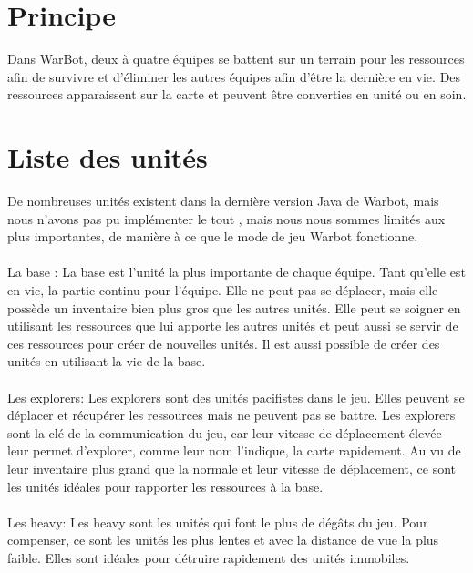 \documentclass{report}
\begin{document}
\section{Principe}
Dans WarBot, deux à quatre équipes se battent sur un terrain pour les ressources afin de survivre et d'éliminer les autres équipes afin d’être la dernière en vie. Des ressources apparaissent sur la carte et peuvent être converties en unité ou en soin.

\section{Liste des unités}
De nombreuses unités existent dans la dernière version Java de Warbot, mais nous n’avons pas pu implémenter le tout , mais nous nous sommes limités aux plus importantes, de manière à ce que le mode de jeu Warbot fonctionne.
\paragraph{}
La base :\newline
La base est l’unité la plus importante de chaque équipe. Tant qu’elle est en vie, la partie continu pour l’équipe. \newline
Elle ne peut pas se déplacer, mais elle possède un inventaire bien plus gros que les autres unités. Elle peut se soigner en utilisant les ressources que lui apporte les autres unités et peut aussi se servir de ces ressources pour créer de nouvelles unités. Il est aussi possible de créer des unités en utilisant la vie de la base.
\paragraph{}
Les explorers:\newline
Les explorers sont des unités pacifistes dans le jeu. Elles peuvent se déplacer et récupérer les ressources mais ne peuvent pas se battre.\newline
Les explorers sont la clé de la communication du jeu, car leur vitesse de déplacement élevée leur permet d’explorer, comme leur nom l’indique, la carte rapidement. \newline
Au vu de leur inventaire plus grand que la normale et leur vitesse de déplacement, ce sont les unités idéales pour rapporter les ressources à la base.
\paragraph{}
Les heavy:\newline
Les heavy sont les unités qui font le plus de dégâts du jeu. Pour compenser, ce sont les unités les plus lentes et avec la distance de vue la plus faible. \newline
Elles sont idéales pour détruire rapidement des unités immobiles.
\end{document}
